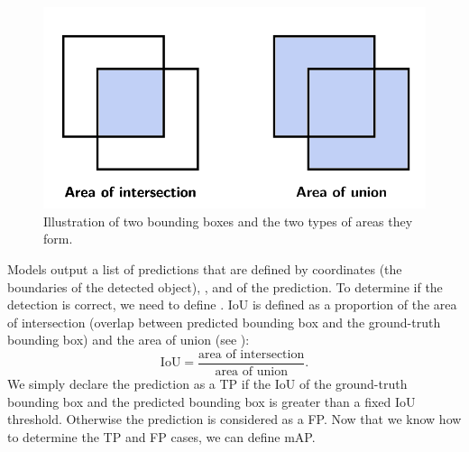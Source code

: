 \begin{figure}[H]
    \centering
    \includegraphics[width=0.6\linewidth]{Sources/Figures/iou.png}
    \caption{Illustration of two bounding boxes and the two types of areas they
        form.}
    \label{fig:iou}
\end{figure}

Models output a list of predictions that are defined by 
coordinates (the boundaries of the detected object), , and
 of the prediction. To determine if the detection is
correct, we need to define . IoU is
defined as a proportion of the area of intersection (overlap between
predicted bounding box and the ground-truth bounding box) and the area of union
(see ):
$$
    \text{IoU} = \frac{\text{area of intersection}}{\text{area of union}}.
$$
We simply declare the prediction as a TP if the IoU of the ground-truth bounding
box and the predicted bounding box is greater than a fixed IoU threshold.
Otherwise the prediction is considered as a FP. Now that we know how to determine
the TP and FP cases, we can define mAP.

